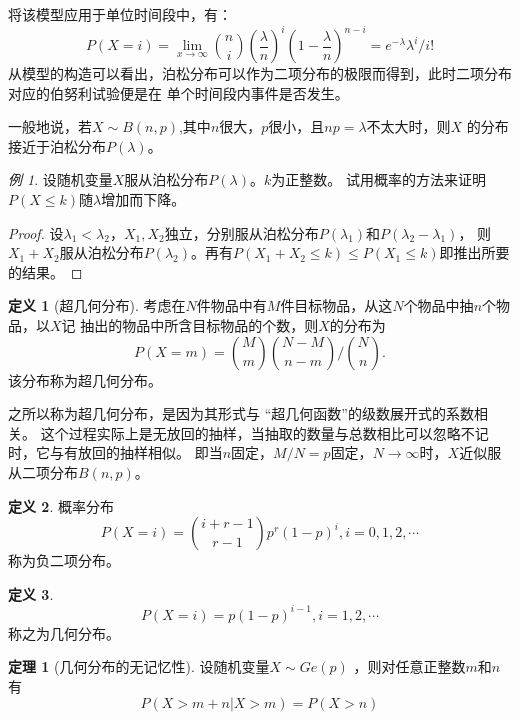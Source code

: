 \documentclass[a4paper,11pt]{article}%
\theoremstyle{remark}
\theoremstyle{remark}
\newtheorem*{example}{例}
\theoremstyle{definition}
\newtheorem{theorem}{定理}[section]
\theoremstyle{definition}
\newtheorem*{definition}{定义}
\theoremstyle{plain}
\begin{document}
将该模型应用于单位时间段中，有：
\[P(X=i)=\lim_{x\rightarrow\infty}\binom{n}{i}(\frac{\lambda}{n})^i(1-\frac{\lambda}{n})^{n-i}=e^{-\lambda}\lambda^i/i!\]
从模型的构造可以看出，泊松分布可以作为二项分布的极限而得到，此时二项分布对应的伯努利试验便是在
单个时间段内事件是否发生。

一般地说，若$X\sim B(n,p)$,其中$n$很大，$p$很小，且$np=\lambda$不太大时，则$X$
的分布接近于泊松分布$P(\lambda)$。
\begin{example}
    设随机变量$X$服从泊松分布$P(\lambda)$。$k$为正整数。
    试用概率的方法来证明$P(X\leq k)$随$\lambda$增加而下降。 
    \begin{proof}
        设$\lambda_1<\lambda_2$，$X_1,X_2$独立，分别服从泊松分布$P(\lambda_1)$和$P(\lambda_2-\lambda_1)$，
        则$X_1+X_2$服从泊松分布$P(\lambda_2)$。再有$P(X_1+X_2\leq k)\leq P(X_1\leq k)$即推出所要的结果。
    \end{proof}
\end{example}
\begin{definition}[超几何分布]
   考虑在$N$件物品中有$M$件目标物品，从这$N$个物品中抽$n$个物品，以$X$记
   抽出的物品中所含目标物品的个数，则$X$的分布为
   \[P(X=m)=\binom{M}{m}\binom{N-M}{n-m}/\binom{N}{n}.\]
   该分布称为超几何分布。 
\end{definition}
之所以称为超几何分布，是因为其形式与 ``超几何函数''的级数展开式的系数相关。
这个过程实际上是无放回的抽样，当抽取的数量与总数相比可以忽略不记时，它与有放回的抽样相似。
即当$n$固定，$M/N=p$固定，$N\rightarrow\infty$时，$X$近似服从二项分布$B(n,p)$。
\begin{definition}
    概率分布 
    \[P(X=i)=\binom{i+r-1}{r-1}p^r(1-p)^i,i=0,1,2,\cdots\]
    称为负二项分布。
\end{definition}
\begin{definition}
    \[P(X=i)=p(1-p)^{i-1},i=1,2,\cdots\]
    称之为几何分布。
\end{definition}
\begin{theorem}[几何分布的无记忆性]
   设随机变量$X\sim Ge(p)$ ，则对任意正整数$m$和$n$有
   \[P(X>m+n|X>m)=P(X>n)\]
\end{theorem}
\end{document}
